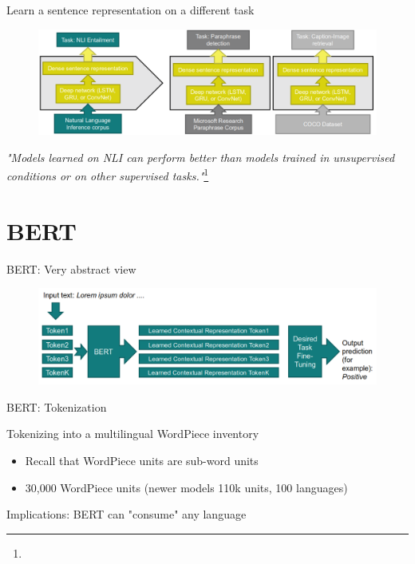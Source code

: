 \documentclass[12pt,aspectratio=169,handout]{beamer}
\begin{document}
\begin{frame}{Learn a sentence representation on a different task}
	
	\begin{figure}
		\includegraphics[width=0.9\linewidth]{img/transfer.png}
	\end{figure}
	
	\begin{small}
		\emph{"Models learned on NLI can perform better than models trained in unsupervised conditions or on other supervised tasks."}\footnote{}
	\end{small}
	
	
\end{frame}


\section{BERT}


\begin{frame}{BERT: Very abstract view}
	
	\begin{figure}
		\includegraphics[width=\linewidth]{img/bert1.png}
	\end{figure}	
	
\end{frame}


\begin{frame}{BERT: Tokenization}
	
	Tokenizing into a multilingual WordPiece inventory
	
	\begin{itemize}
		\item Recall that WordPiece units are sub-word units
		\item 30,000 WordPiece units (newer models 110k units, 100 languages)
	\end{itemize}
	
	Implications: BERT can "consume" any language
	
	
\end{frame}
\end{document}
